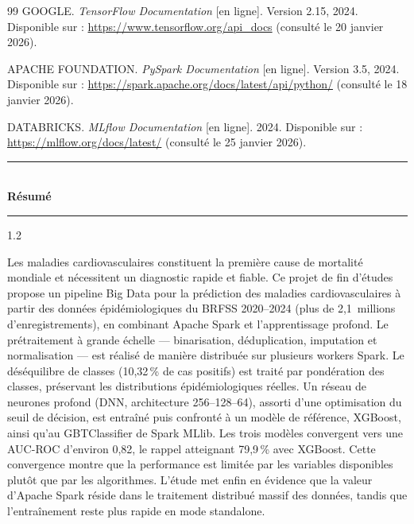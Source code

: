 \documentclass[12pt,a4paper]{report}
\begin{document}
\begin{thebibliography}{99}
GOOGLE.
\textit{TensorFlow Documentation} [en ligne]. Version 2.15, 2024.
Disponible sur : \url{https://www.tensorflow.org/api_docs}
(consulté le 20 janvier 2026).

APACHE FOUNDATION.
\textit{PySpark Documentation} [en ligne]. Version 3.5, 2024.
Disponible sur : \url{https://spark.apache.org/docs/latest/api/python/}
(consulté le 18 janvier 2026).

DATABRICKS.
\textit{MLflow Documentation} [en ligne]. 2024.
Disponible sur : \url{https://mlflow.org/docs/latest/}
(consulté le 25 janvier 2026).

\end{thebibliography}


\newpage
\thispagestyle{empty}

\vspace*{0.5cm}

\begin{center}
    {\color{black}\rule{0.75\textwidth}{1.2pt}}\\[0.4cm]
    {\Huge\bfseries Résumé}\\[0.3cm]
    {\color{black}\rule{0.45\textwidth}{0.6pt}}
\end{center}

\vspace{1.5cm}

\begin{spacing}{1.2}

Les maladies cardiovasculaires constituent la première cause de mortalité mondiale
et nécessitent un diagnostic rapide et fiable. Ce projet de fin d'études propose
un pipeline Big Data pour la prédiction des maladies cardiovasculaires à partir des
données épidémiologiques du \acs{BRFSS} 2020--2024 (plus de 2,1~millions
d'enregistrements), en combinant Apache Spark et l'apprentissage profond. Le
prétraitement à grande échelle — binarisation, déduplication, imputation et
normalisation — est réalisé de manière distribuée sur plusieurs workers Spark. Le
déséquilibre de classes (10,32\,\% de cas positifs) est traité par pondération des
classes, préservant les distributions épidémiologiques réelles. Un réseau de
neurones profond (\acs{DNN}, architecture 256--128--64), assorti d'une optimisation
du seuil de décision, est entraîné puis confronté à un modèle de référence,
\acs{XGBoost}, ainsi qu'au GBTClassifier de Spark MLlib. Les trois modèles convergent
vers une \acs{AUC}-\acs{ROC} d'environ 0,82, le rappel atteignant 79,9\,\% avec
XGBoost. Cette convergence montre que la performance est limitée par les variables
disponibles plutôt que par les algorithmes. L'étude met enfin en évidence que la
valeur d'Apache Spark réside dans le traitement distribué massif des données, tandis
que l'entraînement reste plus rapide en mode standalone.

\end{spacing}
\end{document}
